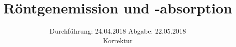 

\subject{602}
\title{Röntgenemission und -absorption}
\date{%
  Durchführung: 24.04.2018
  \hspace{3em}
  Abgabe: 22.05.2018 \\
          Korrektur
}



\maketitle
\thispagestyle{empty}
\tableofcontents
\newpage







\printbibliography{}


